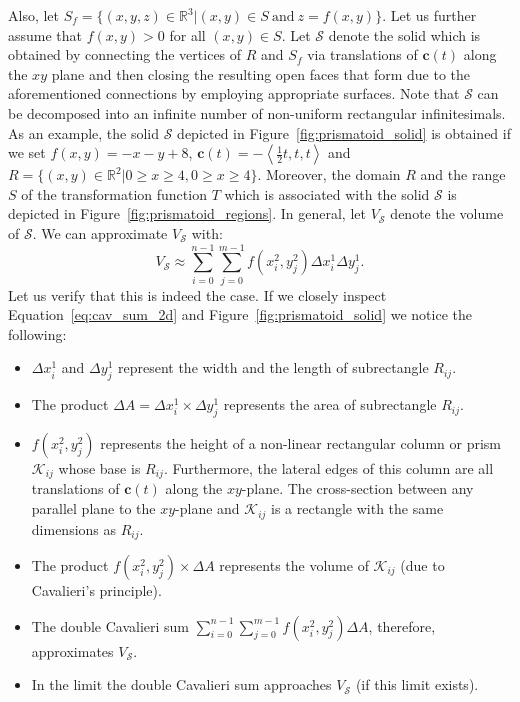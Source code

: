 \documentclass{article}
\theoremstyle{theorem}
\theoremstyle{definition}
\begin{document}
\noindent
Also, let $S_f = \{(x,y,z)\in\mathbb{R}^3|(x,y)\in S ~ \textrm{and} ~ z=f(x,y)\}$.  Let us further assume that $f(x,y) > 0$ for all $(x,y)\in S$. Let $\mathcal{S}$ denote the solid which is obtained by connecting the vertices of $R$ and 
$S_f$ via translations of $\mathbf{c}(t)$ along the $xy$ plane and then closing the resulting open faces that form due to the aforementioned connections by employing appropriate surfaces. Note that 
$\mathcal{S}$ can be decomposed into an infinite number of non-uniform rectangular infinitesimals. As an example, the solid $\mathcal{S}$ depicted in Figure~\ref{fig:prismatoid_solid} is obtained if we set $f(x,y) = -x - y + 8$, $\mathbf{c}(t) = -\left<\frac{1}{2}t,t,t\right>$ and $R = \{(x,y)\in\mathbb{R}^2|0 \geq x \geq 4, 0 \geq x \geq 4\} \nonumber$.
Moreover, the domain $R$ and the range $S$ of the transformation function $T$ which is associated with the solid $\mathcal{S}$ is depicted in Figure~\ref{fig:prismatoid_regions}.  
In general, let $V_{\mathcal{S}}$ denote the volume of $\mathcal{S}$. We can approximate $V_{\mathcal{S}}$ with:
\begin{equation}
\label{eq:cav_sum_2d}
V_{\mathcal{S}} \approx \sum_{i=0}^{n-1} \sum_{j=0}^{m-1} f(x_i^2,y_j^2) \Delta x_i^1 \Delta y_j^1.
\end{equation}
Let us verify that this is indeed the case. If we closely inspect Equation~\ref{eq:cav_sum_2d} and Figure~\ref{fig:prismatoid_solid} we notice the following:
\begin{itemize}
\item $\Delta x_i^1$ and $\Delta y_j^1$ represent the width and the length of subrectangle $R_{ij}$.
\item The product $\Delta A = \Delta x_i^1\times \Delta y_j^1$ represents the area of subrectangle $R_{ij}$.
\item $f(x_i^2,y_j^2)$ represents the height of a non-linear rectangular column or prism $\mathcal{K}_{ij}$ whose base is $R_{ij}$. Furthermore, the lateral edges of this column are all translations 
of $\mathbf{c}(t)$ along the $xy$-plane. The cross-section between any parallel plane to the $xy$-plane and $\mathcal{K}_{ij}$ is a rectangle with the same dimensions as $R_{ij}$. 
\item The product $f(x_i^2,y_j^2)\times \Delta A$ represents the volume of $\mathcal{K}_{ij}$ (due to Cavalieri's principle).
\item The double Cavalieri sum $\sum_{i=0}^{n-1} \sum_{j=0}^{m-1} f(x_i^2,y_j^2) \Delta A$, therefore, approximates $V_{\mathcal{S}}$. 
\item In the limit the double Cavalieri sum approaches $V_{\mathcal{S}}$ (if this limit exists). 
\end{itemize}
\end{document}
